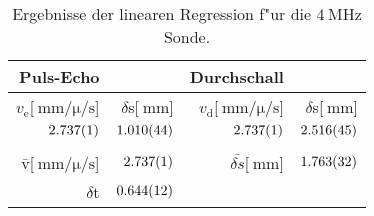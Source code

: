 \begin{table}[!h]
\begin{center}
\begin{tabular}{|r|r|r|r|}
\hline
Puls-Echo & & Durchschall & \\
\hline
\hline
$v_\mathrm{e}$[$\SI{}{\milli\meter\per\micro\per\second}$] & $\delta$s[$\SI{}{\milli\meter}$] & $v_\mathrm{d}$[$\SI{}{\milli\meter\per\micro\per\second}$]& $\delta$s[$\SI{}{\milli\meter}$]\\
\hline
$\SI{2.737 (1)}{}$ & $\SI{1.010 (44)}{}$ & $\SI{2.737 (1)}{}$ & $\SI{2.516 (45)}{}$\\
\hline
\hline
&&&\\
$\bar{\mathrm{v}}$[$\SI{}{\milli\meter\per\micro\per\second}$] & $\SI{2.737 (1)}{}$ & $\bar{\delta s}$[$\SI{}{\milli\meter}$] & $\SI{1.763 (32)}{}$\\
\hline
$\delta$t & $\SI{0.644 (12)}{}$ &&\\
\hline
\end{tabular}
\caption[]{Ergebnisse der linearen Regression f"ur die $\SI{4}{\mega\hertz}$ Sonde.}
\label{r4}
\end{center}
\end{table}